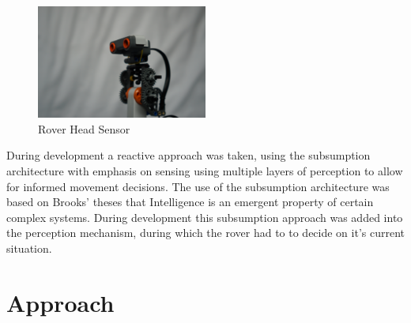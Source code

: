 \documentclass[a4paper,12pt,twocolumn]{report}
\begin{document}
\begin{figure}[b]
 \includegraphics[width=0.5\textwidth]{headshot}
 \caption{Rover Head Sensor}
 \label{fig:stanley-head}
\end{figure}

During development a reactive approach was taken, using the subsumption architecture \citep{wooldridge2009introduction} with emphasis on sensing using multiple layers of perception to allow for informed movement decisions. The use of the subsumption architecture was based on Brooks' theses that Intelligence is an emergent property of certain complex systems. \citep{brooks1991intelligence} During development this subsumption approach was added into the perception mechanism, during which the rover had to to decide on it's current situation.

\section{Approach}



\end{document}
